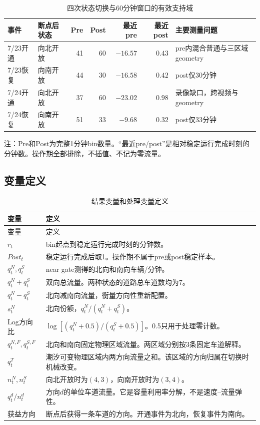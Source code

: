 \documentclass[11pt,a4paper]{ctexart}
\begin{document}
\begin{table}[H]
\centering
\caption{四次状态切换与60分钟窗口的有效支持域}
\label{tab:event_support}
\begin{threeparttable}
\begin{tabular}{llrrrrl}
\toprule
事件 & 断点后状态 & Pre & Post & 最近pre & 最近post & 主要测量问题 \\
\midrule
7/23开通 & 向北开放 & 41 & 60 & $-16.57$ & $0.43$ & pre内混合普通与三区域geometry \\
7/23恢复 & 向南开放 & 44 & 30 & $-16.58$ & $0.42$ & post仅30分钟 \\
7/24开通 & 向北开放 & 37 & 60 & $-23.02$ & $0.98$ & 录像缺口，跨视频与geometry \\
7/24恢复 & 向南开放 & 51 & 33 & $-9.68$ & $0.32$ & post仅33分钟 \\
\bottomrule
\end{tabular}
\begin{tablenotes}[flushleft]\footnotesize
\item 注：Pre和Post为完整1分钟bin数量。“最近pre/post”是相对稳定运行完成时刻的分钟数。操作期全部排除，不插值、不记为零流量。
\end{tablenotes}
\end{threeparttable}
\end{table}

\subsection{变量定义}

\begin{longtable}{p{}p{}}
\caption{结果变量和处理变量定义}\label{tab:variables}\\
\toprule
变量 & 定义 \\
\midrule
\endfirsthead
\toprule
变量 & 定义 \\
\midrule
\endhead
$r_t$ & bin起点到稳定运行完成时刻的分钟数。\\
$Post_t$ & 稳定运行完成后取1。操作期不属于pre或post稳定样本。\\
$q^N_t,q^S_t$ & near gate测得的北向和南向车辆/分钟。\\
$q^N_t+q^S_t$ & 双向总流量。两种状态的道路总车道数均为7。\\
$q^N_t-q^S_t$ & 北向减南向流量，衡量方向性重新配置。\\
$s^N_t$ & 北向份额，$q^N_t/(q^N_t+q^S_t)$。\\
Log方向比 & $\log[(q^N_t+0.5)/(q^S_t+0.5)]$。0.5只用于处理零计数。\\
$q^{N,F}_t,q^{S,F}_t$ & 北向和南向固定物理区域流量。两区域分别按3条固定车道解释。\\
$q^{T}_t$ & 潮汐可变物理区域内两方向流量之和。该区域的方向归属在切换时机械改变。\\
$n^N_t,n^S_t$ & 向北开放时为$(4,3)$，向南开放时为$(3,4)$。\\
$q^d_t/n^d_t$ & 方向$d$的单位车道流量。它是容量利用率分解，不是速度--流量弹性。\\
获益方向 & 断点后获得一条车道的方向。开通事件为北向，恢复事件为南向。\\
\bottomrule
\end{longtable}
\end{document}

